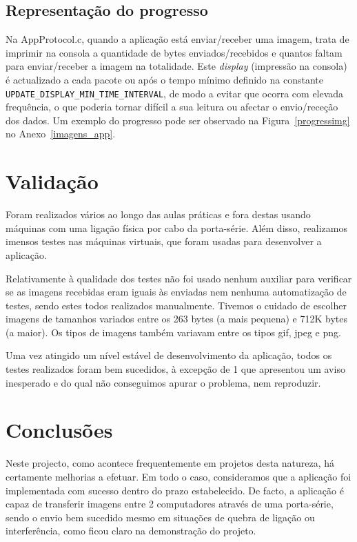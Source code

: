 \documentclass[11pt,a4paper,reqno]{report}
\numberwithin{equation}{section}
\begin{document}
\section{Representação do progresso}
Na AppProtocol.c, quando a aplicação está enviar/receber uma imagem, trata de imprimir na consola a quantidade de bytes enviados/recebidos e quantos faltam para enviar/receber a imagem na totalidade. Este \emph{display} (impressão na consola) é actualizado a cada pacote ou após o tempo mínimo definido na constante \verb|UPDATE_DISPLAY_MIN_TIME_INTERVAL|, de modo a evitar que ocorra com elevada frequência, o que poderia tornar difícil a sua leitura ou afectar o envio/receção dos dados. Um exemplo do progresso pode ser observado na Figura~\ref{progressimg} no Anexo~\ref{imagens_app}.

\chapter{Validação}

Foram realizados vários ao longo das aulas práticas e fora destas usando máquinas com uma ligação física por cabo da porta-série. Além disso, realizamos imensos testes nas máquinas virtuais, que foram usadas para desenvolver a aplicação.

Relativamente à qualidade dos testes não foi usado nenhum auxiliar para verificar se as imagens recebidas eram iguais às enviadas nem nenhuma automatização de testes, sendo estes todos realizados manualmente. Tivemos o cuidado de escolher imagens de tamanhos variados entre os 263 bytes (a mais pequena) e 712K bytes (a maior). Os tipos de imagens também variavam entre os tipos gif, jpeg e png.

Uma vez atingido um nível estável de desenvolvimento da aplicação, todos os testes realizados foram bem sucedidos, à excepção de 1 que apresentou um aviso inesperado e do qual não conseguimos apurar o problema, nem reproduzir.

\chapter{Conclusões}

Neste projecto, como acontece frequentemente em projetos desta natureza, há certamente melhorias a efetuar. Em todo o caso, consideramos que a aplicação foi implementada com sucesso dentro do prazo estabelecido. De facto, a aplicação é capaz de transferir imagens entre 2 computadores através de uma porta-série, sendo o envio bem sucedido mesmo em situações de quebra de ligação ou interferência, como ficou claro na demonstração do projeto.
\end{document}

